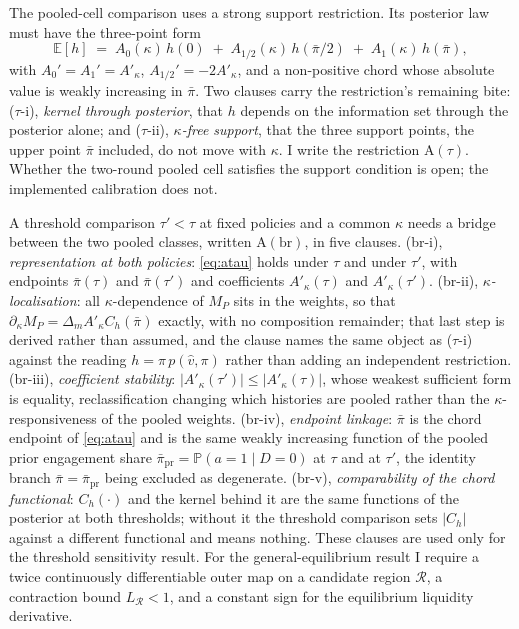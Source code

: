 \documentclass[11pt]{article}
\makeatletter
\newcommand{\compatlabel}[2]{\begingroup\phantomsection\def\@currentlabel{#1}\label{#2}\endgroup}
\newcommand{\Eop}{\mathbb{E}}
\newcommand{\Prb}{\mathbb{P}}
\newcommand{\Atau}{\mathrm{A}(\tau)}
\newcommand{\Abr}{\mathrm{A}(\mathrm{br})}
\newcommand{\Akap}{A'_{\kappa}}
\makeatother
\begin{document}
The pooled-cell comparison uses a strong support restriction. Its posterior law must have the
three-point form
\begin{equation}
\label{eq:atau}
\Eop[h] \;=\; A_0(\kappa)\,h(0) \;+\; A_{1/2}(\kappa)\,h(\bar\pi/2) \;+\; A_1(\kappa)\,h(\bar\pi),
\end{equation}
with $A_0'=A_1'=\Akap$, $A_{1/2}'=-2\Akap$, and a non-positive chord whose absolute value is weakly
increasing in $\bar\pi$. Two clauses carry the restriction's remaining bite: ($\tau$-i),
\emph{kernel through posterior}, that $h$ depends on the information set through the posterior
alone; and ($\tau$-ii), \emph{$\kappa$-free support}, that the three support points, the upper point
$\bar\pi$ included, do not move with $\kappa$. I write the restriction $\Atau$. Whether the
two-round pooled cell satisfies the support condition is open; the implemented calibration does
not.\compatlabel{5}{asm:Atau}

A threshold comparison $\tau'<\tau$ at fixed policies and a common $\kappa$ needs a bridge between
the two pooled classes, written $\Abr$, in five clauses. (br-i), \emph{representation at both
policies}: \eqref{eq:atau} holds under $\tau$ and under $\tau'$, with endpoints $\bar\pi(\tau)$ and
$\bar\pi(\tau')$ and coefficients $\Akap(\tau)$ and $\Akap(\tau')$. (br-ii),
\emph{$\kappa$-localisation}: all $\kappa$-dependence of $M_P$ sits in the weights, so that
$\partial_\kappa M_P=\Delta_m\Akap C_h(\bar\pi)$ exactly, with no composition remainder; that last
step is derived rather than assumed, and the clause names the same object as ($\tau$-i) against the
reading $h=\pi\,p(\hat v,\pi)$ rather than adding an independent restriction. (br-iii),
\emph{coefficient stability}: $|\Akap(\tau')|\leq|\Akap(\tau)|$, whose weakest sufficient form is
equality, reclassification changing which histories are pooled rather than the $\kappa$-responsiveness
of the pooled weights. (br-iv), \emph{endpoint linkage}: $\bar\pi$ is the chord endpoint of
\eqref{eq:atau} and is the same weakly increasing function of the pooled prior engagement share
$\bar\pi_{\mathrm{pr}}=\Prb(a=1\mid D=0)$ at $\tau$ and at $\tau'$, the identity branch
$\bar\pi=\bar\pi_{\mathrm{pr}}$ being excluded as degenerate. (br-v), \emph{comparability of the
chord functional}: $C_h(\cdot)$ and the kernel behind it are the same functions of the posterior at
both thresholds; without it the threshold comparison sets $|C_h|$ against a different functional and
means nothing. These clauses are used only for the threshold sensitivity result. For the
general-equilibrium result I require a twice continuously differentiable outer map on a candidate
region $\mathcal R$, a contraction bound $L_{\mathcal R}<1$, and a constant sign for the equilibrium
liquidity derivative.\compatlabel{6}{asm:bridge}
\compatlabel{6(a)}{asm:Abr}
\compatlabel{6(b)}{asm:AGE}
\end{document}
